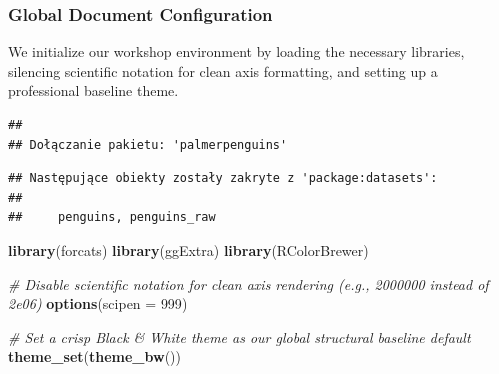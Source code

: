 \documentclass[
]{article}
\newenvironment{Shaded}{\begin{snugshade}}{\end{snugshade}}
\newcommand{\AttributeTok}[1]{\textcolor[rgb]{0.13,0.29,0.53}{#1}}
\newcommand{\CommentTok}[1]{\textcolor[rgb]{0.56,0.35,0.01}{\textit{#1}}}
\newcommand{\ConstantTok}[1]{\textcolor[rgb]{0.56,0.35,0.01}{#1}}
\newcommand{\DecValTok}[1]{\textcolor[rgb]{0.00,0.00,0.81}{#1}}
\newcommand{\FunctionTok}[1]{\textcolor[rgb]{0.13,0.29,0.53}{\textbf{#1}}}
\newcommand{\NormalTok}[1]{#1}
\newcommand{\SpecialCharTok}[1]{\textcolor[rgb]{0.81,0.36,0.00}{\textbf{#1}}}
\begin{document}
\subsubsection{Global Document
Configuration}\label{global-document-configuration}

We initialize our workshop environment by loading the necessary
libraries, silencing scientific notation for clean axis formatting, and
setting up a professional baseline theme.

\begin{Shaded}
\end{Shaded}

\begin{verbatim}
## 
## Dołączanie pakietu: 'palmerpenguins'
\end{verbatim}

\begin{verbatim}
## Następujące obiekty zostały zakryte z 'package:datasets':
## 
##     penguins, penguins_raw
\end{verbatim}

\begin{Shaded}
\begin{Highlighting}[]
\FunctionTok{library}\NormalTok{(forcats)}
\FunctionTok{library}\NormalTok{(ggExtra)}
\FunctionTok{library}\NormalTok{(RColorBrewer)}

\CommentTok{\# Disable scientific notation for clean axis rendering (e.g., 2000000 instead of 2e06)}
\FunctionTok{options}\NormalTok{(}\AttributeTok{scipen =} \DecValTok{999}\NormalTok{)}

\CommentTok{\# Set a crisp Black \& White theme as our global structural baseline default}
\FunctionTok{theme\_set}\NormalTok{(}\FunctionTok{theme\_bw}\NormalTok{())}
\end{Highlighting}
\end{Shaded}
\end{document}
